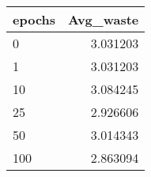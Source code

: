 \begin{tabular}{lr}
\toprule
epochs &  Avg\_waste \\
\midrule
     0 &   3.031203 \\
     1 &   3.031203 \\
    10 &   3.084245 \\
    25 &   2.926606 \\
    50 &   3.014343 \\
   100 &   2.863094 \\
\bottomrule
\end{tabular}
